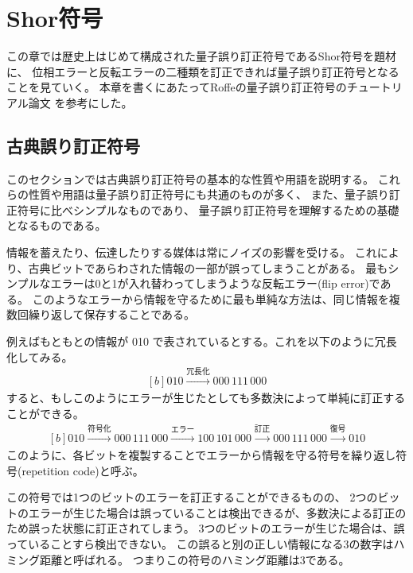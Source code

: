 \documentclass[../master.tex]{subfiles}
\begin{document}
\chapter{Shor符号}
この章では歴史上はじめて構成された量子誤り訂正符号であるShor符号を題材に、
位相エラーと反転エラーの二種類を訂正できれば量子誤り訂正符号となることを見ていく。
本章を書くにあたってRoffeの量子誤り訂正符号のチュートリアル論文
\cite{Roffe2019-ij}
を参考にした。

\section{古典誤り訂正符号}
このセクションでは古典誤り訂正符号の基本的な性質や用語を説明する。
これらの性質や用語は量子誤り訂正符号にも共通のものが多く、
また、量子誤り訂正符号に比べシンプルなものであり、
量子誤り訂正符号を理解するための基礎となるものである。

情報を蓄えたり、伝達したりする媒体は常にノイズの影響を受ける。
これにより、古典ビットであらわされた情報の一部が誤ってしまうことがある。
最もシンプルなエラーは0と1が入れ替わってしまうような反転エラー(flip error)である。
このようなエラーから情報を守るために最も単純な方法は、同じ情報を複数回繰り返して保存することである。

例えばもともとの情報が 010 で表されているとする。これを以下のように冗長化してみる。
\begin{equation}\begin{aligned}[b]
    010 \xrightarrow{\text{冗長化}} 000\,111\,000
\end{aligned}\end{equation}
すると、もしこのようにエラーが生じたとしても多数決によって単純に訂正することができる。
\begin{equation}\begin{aligned}[b]
    010
    \xrightarrow{\text{符号化}} 000\,111\,000
    \xrightarrow{\text{エラー}} 100\,101\,000
    \xrightarrow{\text{訂正}} 000\,111\,000
    \xrightarrow{\text{復号}} 010
\end{aligned}\end{equation}
このように、各ビットを複製することでエラーから情報を守る符号を繰り返し符号(repetition code)と呼ぶ。

この符号では1つのビットのエラーを訂正することができるものの、
2つのビットのエラーが生じた場合は誤っていることは検出できるが、多数決による訂正のため誤った状態に訂正されてしまう。
3つのビットのエラーが生じた場合は、誤っていることすら検出できない。
この誤ると別の正しい情報になる3の数字はハミング距離と呼ばれる。
つまりこの符号のハミング距離は3である。
\end{document}
